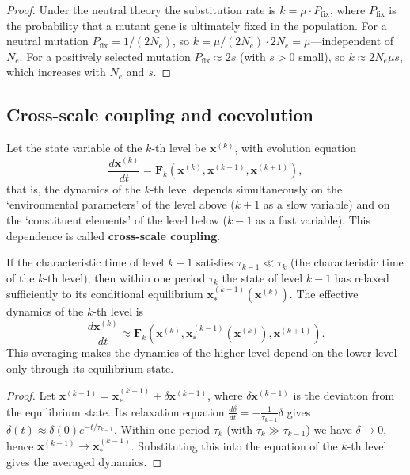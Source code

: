 \begin{proof}
Under the neutral theory the substitution rate is $k = \mu \cdot P_{\text{fix}}$, where $P_{\text{fix}}$ is the probability that a mutant gene is ultimately fixed in the population. For a neutral mutation $P_{\text{fix}} = 1/(2N_e)$, so $k = \mu/(2N_e) \cdot 2N_e = \mu$---independent of $N_e$. For a positively selected mutation $P_{\text{fix}} \approx 2s$ (with $s > 0$ small), so $k \approx 2N_e \mu s$, which increases with $N_e$ and $s$.
\end{proof}

\subsection{Cross-scale coupling and coevolution}

\begin{definition}\label{def:cross_scale_coupling}
Let the state variable of the $k$-th level be $\mathbf{x}^{(k)}$, with evolution equation
\[
\frac{d\mathbf{x}^{(k)}}{dt} = \mathbf{F}_k(\mathbf{x}^{(k)}, \mathbf{x}^{(k-1)}, \mathbf{x}^{(k+1)}),
\]
that is, the dynamics of the $k$-th level depends simultaneously on the `environmental parameters' of the level above ($k+1$ as a slow variable) and on the `constituent elements' of the level below ($k-1$ as a fast variable). This dependence is called \textbf{cross-scale coupling}.
\end{definition}

\begin{proposition}\label{prop:adiabatic_averaging}
If the characteristic time of level $k-1$ satisfies $\tau_{k-1} \ll \tau_k$ (the characteristic time of the $k$-th level), then within one period $\tau_k$ the state of level $k-1$ has relaxed sufficiently to its conditional equilibrium $\mathbf{x}^{(k-1)}_*(\mathbf{x}^{(k)})$. The effective dynamics of the $k$-th level is
\[
\frac{d\mathbf{x}^{(k)}}{dt} \approx \mathbf{F}_k(\mathbf{x}^{(k)}, \mathbf{x}^{(k-1)}_*(\mathbf{x}^{(k)}), \mathbf{x}^{(k+1)}).
\]
This averaging makes the dynamics of the higher level depend on the lower level only through its equilibrium state.
\end{proposition}

\begin{proof}
Let $\mathbf{x}^{(k-1)} = \mathbf{x}^{(k-1)}_* + \delta \mathbf{x}^{(k-1)}$, where $\delta \mathbf{x}^{(k-1)}$ is the deviation from the equilibrium state. Its relaxation equation $\frac{d\delta}{dt} = -\frac{1}{\tau_{k-1}}\delta$ gives $\delta(t) \approx \delta(0) e^{-t/\tau_{k-1}}$. Within one period $\tau_k$ (with $\tau_k \gg \tau_{k-1}$) we have $\delta \to 0$, hence $\mathbf{x}^{(k-1)} \to \mathbf{x}^{(k-1)}_*$. Substituting this into the equation of the $k$-th level gives the averaged dynamics.
\end{proof}

